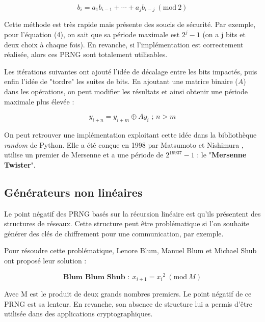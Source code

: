 \documentclass[9pt,a4paper,twoside,english]{class/backend}
\begin{document}
        \begin{equation}
            b_i = a_1 b_{i-1} + \cdots + a_j b_{i-j} \ (\text{mod} \ 2)
        \end{equation}
    
    Cette méthode est très rapide mais présente des soucis de sécurité. Par exemple, pour l'équation (4), on sait que sa période maximale est $2^j-1$ (on a j bits et deux choix à chaque fois). En revanche, si l'implémentation est correctement réalisée, alors ces PRNG sont totalement utilisables.
    
    Les itérations suivantes ont ajouté l'idée de décalage entre les bits impactés, puis enfin l'idée de "tordre" les suites de bits. En ajoutant une matrice binaire ($A$) dans les opérations, on peut modifier les résultats et ainsi obtenir une période maximale plus élevée :
    
        \begin{equation}
            y_{i+n} = y_{i+m} \oplus A y_i \text{ ; } n > m 
        \end{equation}
    
    On peut retrouver une implémentation exploitant cette idée dans la bibliothèque \textit{random} de Python. Elle a été conçue en 1998 par Matsumoto et Nishimura \cite{MersenneTwister}, utilise un premier de Mersenne et a une période de $2^{19937}-1$ : le "\textbf{Mersenne Twister}".
    
    \subsection{Générateurs non linéaires}\smallskip

    \hspace{10pt}Le point négatif des PRNG basés sur la récursion linéaire est qu'ils présentent des structures de réseaux. Cette structure peut être problématique si l'on souhaite générer des clés de chiffrement pour une communication, par exemple.
    
    Pour résoudre cette problématique, Lenore Blum, Manuel Blum et Michael Shub ont proposé leur solution \cite{BlumBlumShub} :
    
        \begin{equation}{\textbf{Blum Blum Shub }:}
            \ x_{i+1} = {x_i}^2\ (\text{mod} \ M)
        \end{equation}
    
    Avec M est le produit de deux grands nombres premiers. Le point négatif de ce PRNG est sa lenteur. En revanche, son absence de structure lui a permis d'être utilisée dans des applications cryptographiques. 
    
\end{document}
